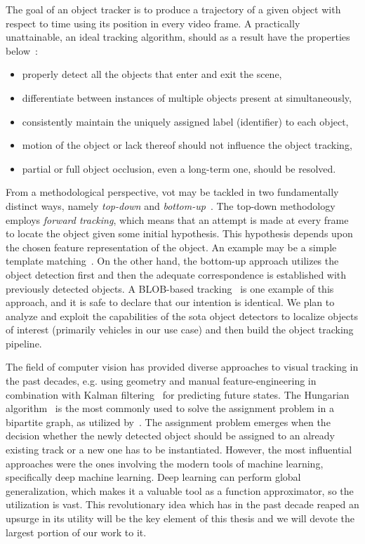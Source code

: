 The goal of an object tracker is to produce a trajectory of a given object with respect to time using its position in every video frame. A practically unattainable, an ideal tracking algorithm, should as a result have the properties below~\cite{jalal2012sotavot}:

\begin{itemize}
    \item properly detect all the objects that enter and exit the scene,
    \item differentiate between instances of multiple objects present at simultaneously,
    \item consistently maintain the uniquely assigned label (identifier) to each object,
    \item motion of the object or lack thereof should not influence the object tracking,
    \item partial or full object occlusion, even a long-term one, should be resolved.
\end{itemize}

From a methodological perspective, \gls{vot} may be tackled in two fundamentally distinct ways, namely \emph{top-down} and \emph{bottom-up}~\cite{jalal2012sotavot}. The top-down methodology employs \emph{forward tracking}, which means that an attempt is made at every frame to locate the object given some initial hypothesis. This hypothesis depends upon the chosen feature representation of the object. An example may be a simple template matching~\cite{comaniciu2003kernel}. On the other hand, the bottom-up approach utilizes the object detection first and then the adequate correspondence is established with previously detected objects. A BLOB-based tracking~\cite{wren1997pfinder} is one example of this approach, and it is safe to declare that our intention is identical. We plan to analyze and exploit the capabilities of the \gls{sota} object detectors to localize objects of interest (primarily vehicles in our use case) and then build the object tracking pipeline.

The field of computer vision has provided diverse approaches to visual tracking in the past decades, e.g. using geometry and manual feature-engineering in combination with Kalman filtering~\cite{kalman1960linearfilter} for predicting future states. The Hungarian algorithm~\cite{kuhn1995hungarian} is the most commonly used to solve the assignment problem in a bipartite graph, as utilized by~\cite{bawley2016simple}. The assignment problem emerges when the decision whether the newly detected object should be assigned to an already existing track or a new one has to be instantiated. However, the most influential approaches were the ones involving the modern tools of machine learning, specifically deep machine learning. Deep learning can perform global generalization, which makes it a valuable tool as a function approximator, so the utilization is vast. This revolutionary idea which has in the past decade reaped an upsurge in its utility will be the key element of this thesis and we will devote the largest portion of our work to it.

